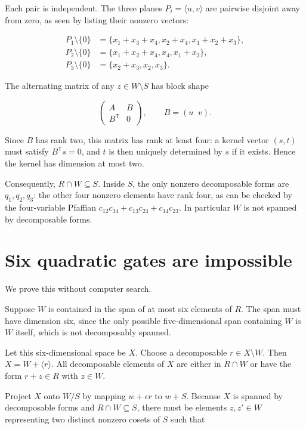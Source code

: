 Each pair is independent. The three planes $P_i=\langle u,v\rangle$ are pairwise disjoint away from zero, as seen by listing their nonzero vectors:

\[\begin{aligned}
P_1\setminus\{0\}&=\{x_1+x_3+x_4,x_2+x_4,x_1+x_2+x_3\},\\
P_2\setminus\{0\}&=\{x_1+x_2+x_4,x_4,x_1+x_2\},\\
P_3\setminus\{0\}&=\{x_2+x_3,x_2,x_3\}.
\end{aligned}\]

The alternating matrix of any $z\in W\setminus S$ has block shape

\[\begin{pmatrix}A&B\\B^{\mathsf T}&0\end{pmatrix},
\qquad B=(u\;\;v).\]

Since $B$ has rank two, this matrix has rank at least four: a kernel vector $(s,t)$ must satisfy $B^{\mathsf T}s=0$, and $t$ is then uniquely determined by $s$ if it exists. Hence the kernel has dimension at most two.

Consequently, $R\cap W\subseteq S$. Inside $S$, the only nonzero decomposable forms are $q_1,q_2,q_3$: the other four nonzero elements have rank four, as can be checked by the four-variable Pfaffian $c_{12}c_{34}+c_{13}c_{24}+c_{14}c_{23}$. In particular $W$ is not spanned by decomposable forms.

\section{Six quadratic gates are impossible}

We prove this without computer search.

Suppose $W$ is contained in the span of at most six elements of $R$. The span must have dimension six, since the only possible five-dimensional span containing $W$ is $W$ itself, which is not decomposably spanned.

Let this six-dimensional space be $X$. Choose a decomposable $r\in X\setminus W$. Then $X=W+\langle r\rangle$. All decomposable elements of $X$ are either in $R\cap W$ or have the form $r+z\in R$ with $z\in W$.

Project $X$ onto $W/S$ by mapping $w+\epsilon r$ to $w+S$. Because $X$ is spanned by decomposable forms and $R\cap W\subseteq S$, there must be elements $z,z'\in W$ representing two distinct nonzero cosets of $S$ such that

